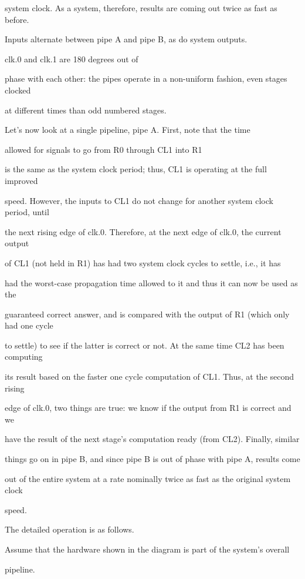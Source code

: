 \documentclass[12pt,dvips]{article}
\begin{document}
system clock. As a system, therefore, results are coming out twice as fast as before.

Inputs alternate between pipe A and pipe B, as do system outputs.

clk.0 and clk.1 are 180 degrees out of

phase with each other: the pipes operate in a non-uniform fashion, even stages clocked

at different times than odd numbered stages.



Let's now look at a single pipeline, pipe A. First, note that the time

allowed for signals to go from R0 through CL1 into R1

is the same as the system clock period; thus, CL1 is operating at the full improved

speed. However, the inputs to CL1 do not change for another system clock period, until

the next rising edge of clk.0. Therefore, at the next edge of clk.0, the current output

of CL1 (not held in R1) has had two system clock cycles to settle, i.e., it has

had the worst-case propagation time allowed to it and thus it can now be used as the

guaranteed correct answer, and is compared with the output of R1 (which only had one cycle

to settle) to see if the latter is correct or not. At the same time CL2 has been computing

its result based on the faster one cycle computation of CL1. Thus, at the second rising

edge of clk.0, two things are true: we know if the output from R1 is correct and we

have the result of the next stage's computation ready (from CL2). Finally, similar

things go on in pipe B, and since pipe B is out of phase with pipe A, results come

out of the entire system at a rate nominally twice as fast as the original system clock

speed.



The detailed operation is as follows.

Assume that the hardware shown in the diagram is part of the system's overall

pipeline. 
\end{document}
